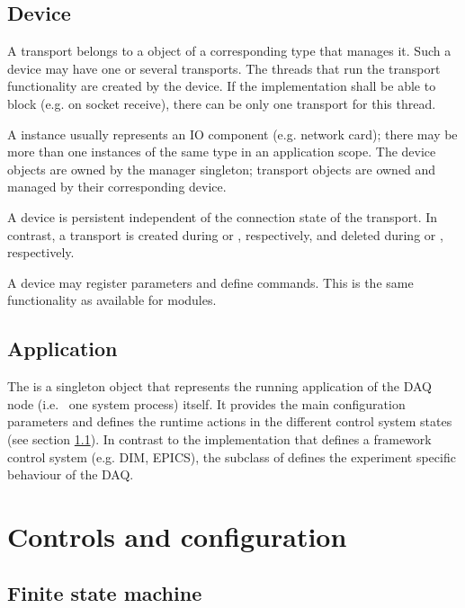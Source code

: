 \subsection{Device}
A transport belongs to a  
 object of a 
corresponding type that manages it. Such a device may have one or several transports.  
The threads that run the transport functionality are
created by the device. If the  implementation 
shall be able to block (e.g. on socket receive), there can be only 
one transport for this thread. 

A  instance usually represents an IO component (e.g. network card); 
there may be more than one  instances of the same 
type in an application scope. 
The device objects are owned by the manager 
singleton; transport objects are owned and managed by their corresponding device.  

A device is persistent independent of the connection state 
of the transport. In contrast, a transport is created 
during  or , respectively,
and deleted during  or , respectively. 

A device may register parameters and define 
commands. This is the same functionality as available for modules.   
   
   


\subsection{Application}
The  
is a singleton object that represents the running application of the DAQ node 
(i.e.~ one system process) itself. It provides the main configuration parameters
and defines the runtime actions in the different control system states (see section \ref{prog_fsm}).
In contrast to the  implementation that defines a framework control system (e.g. DIM, EPICS), the subclass of  defines the experiment specific behaviour of the DAQ.


               
\section{Controls and configuration}
\subsection{Finite state machine}
\label{prog_fsm}

